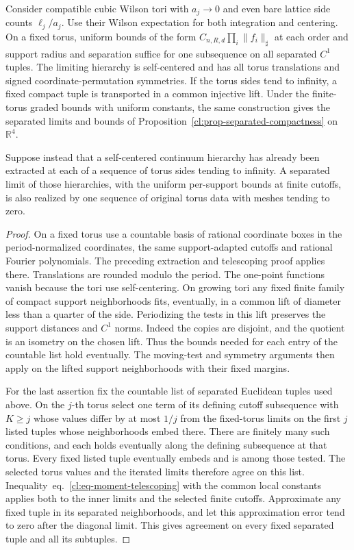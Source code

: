 \documentclass[11pt,letterpaper,reqno]{amsart}
\makeatletter
\numberwithin{equation}{section}
\renewcommand{\eqref}[1]{\textup{eq.~\ref{#1}}}
\theoremstyle{definition}
\newcommand{\ms@majorstart}{%
  \pushQED{\qed}\renewcommand{\qedsymbol}{$\blacksquare\square$}}
\newenvironment{corollary}[1][]{\ms@majorstart\ms@corollary[#1]}
  {\popQED\endms@corollary}
\theoremstyle{remark}
\makeatother
\begin{document}
\begin{corollary}[Torus sequences]\label{cl:cor-torus-compactness}
Consider compatible cubic Wilson tori with \(a_j\to0\) and
even bare lattice side counts \(\ell_j/a_j\).
Use their Wilson expectation for both integration and centering.
On a fixed torus, uniform bounds of the form
\(C_{n,R,d}\prod_i\|f_i\|_\sharp\) at each order and support
radius and separation suffice for one subsequence on all
separated \(C^1\) tuples. The limiting hierarchy is self-centered
and has all torus translations and signed coordinate-permutation
symmetries. If the torus sides tend to infinity, a fixed compact
tuple is transported in a common injective lift. Under the
finite-torus graded bounds with uniform constants, the same
construction gives the separated limits and bounds of
Proposition~\ref{cl:prop-separated-compactness} on \(\mathbb R^4\).

Suppose instead that a self-centered continuum hierarchy has
already been extracted at each of a sequence of torus sides
tending to infinity. A separated limit of those hierarchies,
with the uniform per-support bounds at finite cutoffs, is also
realized by one sequence of original torus data with meshes
tending to zero.
\end{corollary}

\begin{proof}
On a fixed torus use a countable basis of rational coordinate
boxes in the period-normalized coordinates, the same
support-adapted cutoffs and rational Fourier polynomials.
The preceding extraction and telescoping proof applies there.
Translations are rounded modulo the period. The one-point
functions vanish because the tori use self-centering.
On growing tori any fixed finite family of compact support
neighborhoods fits, eventually, in a common lift of diameter
less than a quarter of the side. Periodizing the tests in this
lift preserves the support distances and \(C^1\) norms.
Indeed the copies are disjoint, and the quotient is an isometry
on the chosen lift. Thus the bounds needed for each entry of
the countable list hold eventually. The moving-test and
symmetry arguments then apply on the lifted support
neighborhoods with their fixed margins.

For the last assertion fix the countable list of separated
Euclidean tuples used above. On the \(j\)-th torus select one
term of its defining cutoff subsequence with \(K\ge j\) whose
values differ by at most \(1/j\) from the fixed-torus limits
on the first \(j\) listed tuples whose neighborhoods embed
there. There are finitely many such conditions, and each
holds eventually along the defining subsequence at that torus.
Every fixed listed tuple eventually embeds and is among those
tested. The selected torus values and the iterated limits
therefore agree on this list. Inequality~\eqref{cl:eq-moment-telescoping}
with the common local constants applies both to the inner
limits and the selected finite cutoffs. Approximate any fixed
tuple in its separated neighborhoods, and let this approximation
error tend to zero after the diagonal limit. This gives agreement
on every fixed separated tuple and all its subtuples.
\end{proof}
\end{document}

